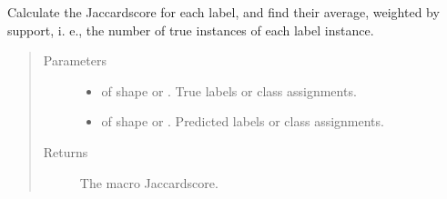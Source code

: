 \documentclass[letterpaper,10pt,english]{sphinxmanual}
\begin{document}
\begin{fulllineitems}
\label{\detokenize{pusion.evaluation.evaluation_metrics:pusion.evaluation.evaluation_metrics.weighted_jaccard}}
\sphinxAtStartPar
Calculate the Jaccard\sphinxhyphen{}score for each label, and find their average, weighted by support, i. e., the number of true instances of each label instance.
\begin{quote}\begin{description}
\item[{Parameters}] \leavevmode\begin{itemize}
\item {} 
\sphinxAtStartPar
{} \textendash{}  of shape  or . True labels or class assignments.

\item {} 
\sphinxAtStartPar
{} \textendash{}  of shape  or . Predicted labels or class assignments.

\end{itemize}

\item[{Returns}] \leavevmode
\sphinxAtStartPar
The macro Jaccard\sphinxhyphen{}score.

\end{description}\end{quote}

\end{fulllineitems}

\end{document}
